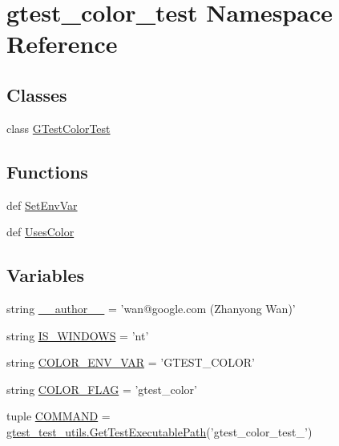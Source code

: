 \hypertarget{namespacegtest__color__test}{\section{gtest\-\_\-color\-\_\-test Namespace Reference}
\label{namespacegtest__color__test}
}
\subsection*{Classes}
\begin{DoxyCompactItemize}
\item 
class \hyperlink{classgtest__color__test_1_1_g_test_color_test}{G\-Test\-Color\-Test}
\end{DoxyCompactItemize}
\subsection*{Functions}
\begin{DoxyCompactItemize}
\item 
def \hyperlink{namespacegtest__color__test_a775501fab86844e0d96a0df6b2a0a927}{Set\-Env\-Var}
\item 
def \hyperlink{namespacegtest__color__test_ac37cf66941952ac6fc423c97454b4f76}{Uses\-Color}
\end{DoxyCompactItemize}
\subsection*{Variables}
\begin{DoxyCompactItemize}
\item 
string \hyperlink{namespacegtest__color__test_aed3212d01eb48ec3b2ce43de461f9e84}{\-\_\-\-\_\-author\-\_\-\-\_\-} = 'wan@google.\-com (Zhanyong Wan)'
\item 
string \hyperlink{namespacegtest__color__test_a0d4451a99f88105308f0842eb3ec2938}{I\-S\-\_\-\-W\-I\-N\-D\-O\-W\-S} = 'nt'
\item 
string \hyperlink{namespacegtest__color__test_aa6deaa7da27bcc115fe666abad13419c}{C\-O\-L\-O\-R\-\_\-\-E\-N\-V\-\_\-\-V\-A\-R} = 'G\-T\-E\-S\-T\-\_\-\-C\-O\-L\-O\-R'
\item 
string \hyperlink{namespacegtest__color__test_af5818cea608c0551909fefbeaf0edf20}{C\-O\-L\-O\-R\-\_\-\-F\-L\-A\-G} = 'gtest\-\_\-color'
\item 
tuple \hyperlink{namespacegtest__color__test_aeea73d02198b607c38e9dccb97235322}{C\-O\-M\-M\-A\-N\-D} = \hyperlink{namespacegtest__test__utils_a1bdf3cac86afa675ed37629b183048e9}{gtest\-\_\-test\-\_\-utils.\-Get\-Test\-Executable\-Path}('gtest\-\_\-color\-\_\-test\-\_\-')
\end{DoxyCompactItemize}


